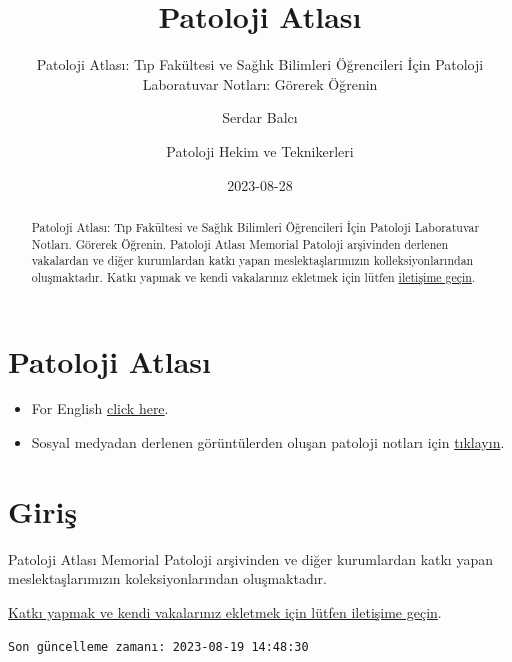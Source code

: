 \documentclass[
  letterpaper,
  DIV=11,
  numbers=noendperiod]{scrreprt}
\title{Patoloji Atlası}
\subtitle{Patoloji Atlası: Tıp Fakültesi ve Sağlık Bilimleri Öğrencileri
İçin Patoloji Laboratuvar Notları: Görerek Öğrenin}
\author{Serdar Balcı \and Patoloji Hekim ve Teknikerleri}
\date{2023-08-28}
\renewcommand*\contentsname{Içindekiler}
\newcommand\contentsname{Içindekiler}
\begin{document}
\maketitle
\begin{abstract}
Patoloji Atlası: Tıp Fakültesi ve Sağlık Bilimleri Öğrencileri İçin
Patoloji Laboratuvar Notları. Görerek Öğrenin. Patoloji Atlası Memorial
Patoloji arşivinden derlenen vakalardan ve diğer kurumlardan katkı yapan
meslektaşlarımızın kolleksiyonlarından oluşmaktadır. Katkı yapmak ve
kendi vakalarınız ekletmek için lütfen
\href{https://www.patolojiatlasi.com/katki.html}{iletişime geçin}.
\end{abstract}
\renewcommand*\contentsname{İçindekiler}
{
\hypersetup{linkcolor=}
\setcounter{tocdepth}{1}
\tableofcontents
}

\hypertarget{sec-patoloji-atlasi}{%
\chapter*{Patoloji Atlası}\label{sec-patoloji-atlasi}}


\begin{itemize}
\item
  For English \href{https://www.histopathologyatlas.com/}{click here}.
\item
  Sosyal medyadan derlenen görüntülerden oluşan patoloji notları için
  \href{https://www.patolojinotlari.com/}{tıklayın}.\\
\end{itemize}


\hypertarget{sec-giris}{%
\chapter*{Giriş}\label{sec-giris}}


Patoloji Atlası Memorial Patoloji arşivinden ve diğer kurumlardan katkı
yapan meslektaşlarımızın koleksiyonlarından oluşmaktadır.

\href{https://www.patolojiatlasi.com/katki.html}{Katkı yapmak ve kendi
vakalarınız ekletmek için lütfen iletişime geçin}.

\begin{verbatim}
Son güncelleme zamanı: 2023-08-19 14:48:30
\end{verbatim}
\end{document}
